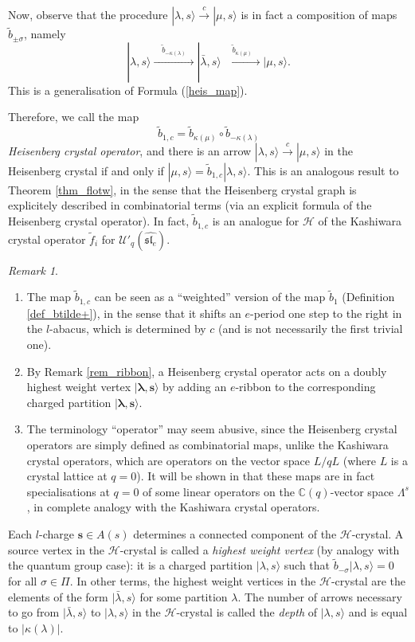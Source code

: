 \documentclass[twoside,12pt]{amsart}
\theoremstyle{plain}
\newcommand{\cH}{\mathcal{H}}
\newcommand{\C}{\mathbb{C}}
\newcommand{\bs}{\mathbf{s}}
\newcommand{\si}{\sigma}
\newcommand{\la}{\lambda}
\newcommand{\ka}{\kappa}
\newcommand{\La}{\Lambda}
\newcommand{\bla}{\boldsymbol{\la}}
\newcommand{\tb}{\tilde{b}}
\newcommand{\tf}{\tilde{f}}
\newcommand{\lra}{\longrightarrow}
\newcommand{\Ue}{\mathcal{U}'_q (\widehat{\mathfrak{sl}_e})}
\theoremstyle{remark}
\newtheorem{rem}[num]{Remark}
\begin{document}
\medskip

Now, observe that the procedure $|\la,s\rangle \overset{c}{\lra} |\mu,s\rangle$ is in fact a composition of 
maps $\tb_{\pm\si}$, namely
$$
|\la,s\rangle \xrightarrow[]{\quad\tb_{-\ka(\la)}\quad} |\bar{\la},s\rangle
\xrightarrow[]{\quad\tb_{\ka(\mu)}\quad}|\mu,s\rangle.
$$
This is a generalisation of Formula (\ref{heis_map}).

Therefore, we call the map
\begin{equation}\label{heis_op}
\tb_{1,c} = \tb_{\ka(\mu)} \circ \tb_{-\ka(\la)}
\end{equation}
\textit{Heisenberg crystal operator},
and there is an arrow $|\la,s\rangle \overset{c}{\lra} |\mu,s\rangle$ in the Heisenberg crystal
if and only if $|\mu,s\rangle = \tb_{1,c} |\la,s\rangle$.
This is an analogous result to Theorem \ref{thm_flotw}, in the sense that
the Heisenberg crystal graph is explicitely described in combinatorial terms (via
an explicit formula of the Heisenberg crystal operator).
In fact, $\tb_{1,c}$ is an analogue for $\cH$ of the Kashiwara crystal operator $\tf_i$
for $\Ue$.

\begin{rem}\label{rem_heis_op} \
\begin{enumerate}
 \item The map $\tb_{1,c}$ can be seen as a ``weighted'' version of the map $\tb_1$ (Definition \ref{def_btilde+}),
in the sense that it shifts an $e$-period one step to the right in the $l$-abacus,
which is determined by $c$ (and is not necessarily the first trivial one).
\item By Remark \ref{rem_ribbon}, a Heisenberg crystal operator acts on a doubly highest weight vertex $|\bla,\bs\rangle$ by adding
an $e$-ribbon to the corresponding charged partition $|\bla,\bs\rangle$.
\item The terminology ``operator'' may seem abusive, since the Heisenberg crystal operators
are simply defined as combinatorial maps, unlike the Kashiwara crystal operators, which are operators on the vector space $L/qL$ 
(where $L$ is a crystal lattice at $q=0$).
It will be shown in \cite{Gerber2016a} that these maps are in fact specialisations at $q=0$ of some linear operators
on the $\C(q)$-vector space $\La^s$, in complete analogy with the Kashiwara crystal operators.
\end{enumerate}
\end{rem}



Each $l$-charge $\bs\in A(s)$ determines a connected component of the $\cH$-crystal.
A source vertex in the $\cH$-crystal is called a \textit{highest weight vertex}
(by analogy with the quantum group case):
it is a charged partition $|\la,s\rangle$ such that $\tb_{-\si}|\la,s\rangle = 0$ for all $\si\in\Pi$.
In other terms, the highest weight vertices in the $\cH$-crystal are the elements of the form
$|\bar{\la},s\rangle$ for some partition $\la$.
The number of arrows necessary to go from $|\bar{\la},s\rangle$ to $|\la,s\rangle$ 
in the $\cH$-crystal is called the \textit{depth} of $|\la,s\rangle$ and is equal to $|\ka(\la)|$.
\end{document}

